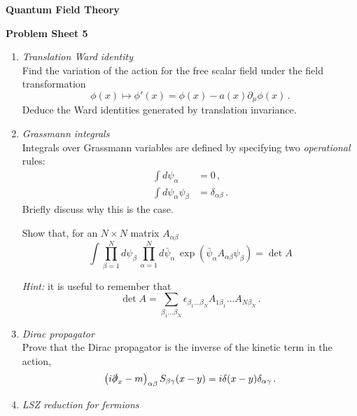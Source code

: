 \documentclass[12pt,a4paper]{article}
\newcommand{\psibar}{\bar{\psi}}
\begin{document}
\begin{center}
{\bf Quantum Field Theory}\\[\baselineskip]
\end{center}
{\bf Problem Sheet 5}

\begin{enumerate}
  \item {\it Translation Ward identity} \\
    
    Find the variation of the action for the free scalar field under
    the field transformation
    \[
    \phi(x) \mapsto \phi'(x) = \phi(x) - a(x) \partial_\mu \phi(x)\, .
    \]
    Deduce the Ward identities generated by translation invariance. 

    \bigskip
    
  \item {\it Grassmann integrals}\\

    Integrals over Grassmann variables are defined by specifying two
    {\em operational} rules:
    \begin{align}
      \int d\psi_\alpha &= 0\, , \nonumber \\
      \int d\psi_\alpha \psi_\beta &= \delta_{\alpha\beta}\, . \nonumber
    \end{align}
    Briefly discuss why this is the case.

    Show that, for an $N\times N$ matrix $A_{\alpha\beta}$ 
    \[
    \int \prod_{\beta=1}^N d\psi_\beta\,
    \prod_{\alpha=1}^N d\psibar_\alpha\,
    \exp\left(
      \psibar_\alpha A_{\alpha\beta} \psi_\beta
      \right) = \det A
    \]
    
    {\em Hint:} it is useful to remember that 
    \[
    \det A = \sum_{\beta_1\ldots \beta_N} 
    \epsilon_{\beta_1\ldots\beta_N} 
    A_{1\beta_1} \ldots A_{N\beta_N}\, .
    \]

    \bigskip

    \item {\it Dirac propagator} \\
      
      Prove that the Dirac propagator is the inverse of the kinetic
      term in the action, \ie
      \[
      \left(i \slashed{\partial}_x -m \right)_{\alpha\beta}
      S_{\beta\gamma}(x-y) = i \delta(x-y) \delta_{\alpha\gamma}\, .
      \]

  \item {\it LSZ reduction for fermions}\\
    

\end{enumerate}
\end{document}
